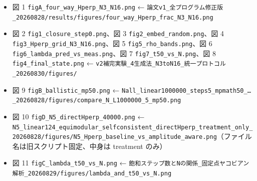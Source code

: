 \documentclass[
  10pt,
  a4paper,
]{ltjsarticle}
\providecommand{\tightlist}{%
  \setlength{\itemsep}{0pt}\setlength{\parskip}{0pt}}
\begin{document}
\begin{itemize}
\tightlist
\item
  図 1 \texttt{figA\_four\_way\_Hperp\_N3\_N16.png} ←
  \texttt{論文v1\_全プログラム修正版\_20260828/results/figures/four\_way\_Hperp\_frac\_N3\_N16.png}
\item
  図 2 \texttt{fig1\_closure\_step0.png}、図 3
  \texttt{fig2\_embed\_random.png}、図 4
  \texttt{fig3\_Hperp\_grid\_N3\_N16.png}、図 5
  \texttt{fig5\_rho\_bands.png}、図 6
  \texttt{fig6\_lambda\_pred\_vs\_meas.png}、図 7
  \texttt{fig7\_t50\_vs\_N.png}、図 8 \texttt{fig4\_final\_state.png} ←
  \texttt{v2補完実験\_4生成法\_N3toN16\_統一プロトコル\_20260830/figures/}
\item
  図 9 \texttt{figB\_ballistic\_mp50.png} ←
  \texttt{Nall\_linear1000000\_steps5\_mpmath50\_…\_20260828/figures/compare\_N\_L1000000\_5\_mp50.png}
\item
  図 10 \texttt{figD\_N5\_directHperp\_40000.png} ←
  \texttt{N5\_linear124\_equimodular\_selfconsistent\_directHperp\_treatment\_only\_20260828/figures/N5\_Hperp\_baseline\_vs\_amplitude\_aware.png}（ファイル名は旧スクリプト固定、中身は
  treatment のみ）
\item
  図 11 \texttt{figC\_lambda\_t50\_vs\_N.png} ←
  \texttt{飽和ステップ数とNの関係\_固定点ヤコビアン解析\_20260829/figures/lambda\_and\_t50\_vs\_N.png}
\end{itemize}
\end{document}
